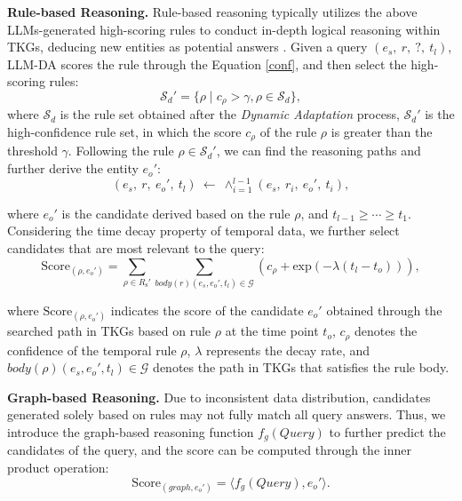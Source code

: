 \documentclass{article}
\begin{document}
\textbf{Rule-based Reasoning.} Rule-based reasoning typically utilizes the above LLMs-generated high-scoring rules to conduct in-depth logical reasoning within TKGs, deducing new entities as potential answers \citep{liu2022tlogic}. Given a query $(e_s,\ r,\ ?,\ t_l)$, LLM-DA scores the rule through the Equation \ref{conf}, and then select the high-scoring rules:
\begin{equation}
    \mathcal{S}_{d}' = \{{\rho \mid c_{\rho} > \gamma, \rho \in \mathcal{S}_{d}}\},
\end{equation}
where $\mathcal{S}_{d}$ is the rule set obtained after the \textit{Dynamic Adaptation} process, $\mathcal{S}_{d}'$ is the high-confidence rule set, in which the score $c_{\rho}$ of the rule $\rho$ is greater than the threshold $\gamma$.
Following the rule $\rho \in \mathcal{S}_{d}'$, we can find the reasoning paths and further derive the entity $e_o'$:
\begin{equation}
    (e_s,\ r,\ e_o',\ t_l)\ \leftarrow\  \wedge_{i=1}^{l-1}(e_s,\ r_i,\ e_o',\ t_i),
\end{equation}

where $e_o'$ is the candidate derived based on the rule $\rho$, and $t_{l-1}\geq \cdots \geq t_1$. Considering the time decay property of temporal data, we further select candidates that are most relevant to the query:
\begin{equation}
    \text{Score}_{(\rho, e_o')}=\sum_{\rho\in R_{\text{s}}'} \sum_{body(r)(e_s,e_o',t_l)\in \mathcal{G}} (c_{\rho} + \text{exp}({-\lambda(t_l -t_o)})),
\end{equation}

where $\text{Score}_{(\rho, e_o')}$ indicates the score of the candidate $e_o'$ obtained through the searched path in TKGs based on rule $\rho$ at the time point $t_o$, $c_{\rho}$ denotes the confidence of the temporal rule $\rho$, $\lambda$ represents the decay rate, and $body(\rho)(e_s,e_o',t_l)\in \mathcal{G}$ denotes the path in TKGs that satisfies the rule body.

\textbf{Graph-based Reasoning.} Due to inconsistent data distribution, candidates generated solely based on rules may not fully match all query answers. Thus, we introduce the graph-based reasoning function $f_g(Query)$ to further predict the candidates of the query, and the score can be computed through the inner product operation:
\begin{equation}
    \text{Score}_{(graph, e_o')}= \langle f_g(Query), e_o'\rangle.
\end{equation}
\end{document}
